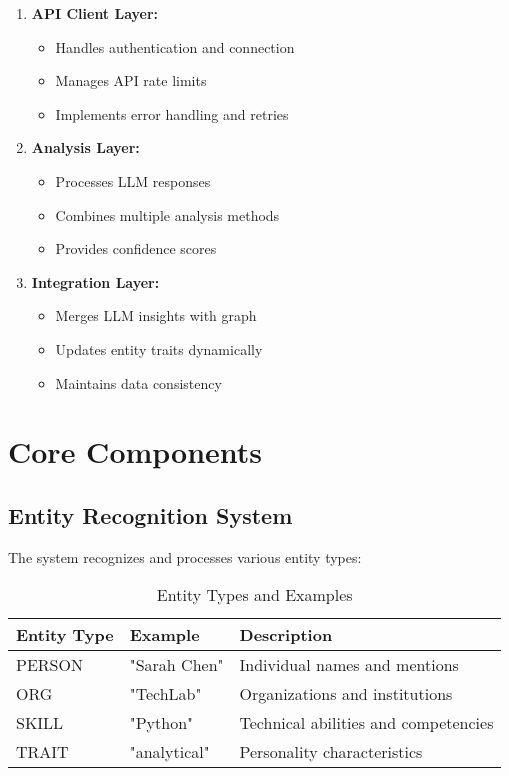 \documentclass[11pt]{article}
\begin{document}
\begin{enumerate}[label=\textbf{\arabic*.}, itemsep=0.5em]
    \item \textbf{API Client Layer:}
    \begin{itemize}
        \item Handles authentication and connection
        \item Manages API rate limits
        \item Implements error handling and retries
    \end{itemize}
    
    \item \textbf{Analysis Layer:}
    \begin{itemize}
        \item Processes LLM responses
        \item Combines multiple analysis methods
        \item Provides confidence scores
    \end{itemize}
    
    \item \textbf{Integration Layer:}
    \begin{itemize}
        \item Merges LLM insights with graph
        \item Updates entity traits dynamically
        \item Maintains data consistency
    \end{itemize}
\end{enumerate}

\section{Core Components}

\subsection{Entity Recognition System}
The system recognizes and processes various entity types:

\begin{table}[H]
\centering
\begin{tabular}{@{}llp{8cm}@{}}
\toprule
\textbf{Entity Type} & \textbf{Example} & \textbf{Description} \\
\midrule
PERSON & "Sarah Chen" & Individual names and mentions \\
ORG & "TechLab" & Organizations and institutions \\
SKILL & "Python" & Technical abilities and competencies \\
TRAIT & "analytical" & Personality characteristics \\
\bottomrule
\end{tabular}
\caption{Entity Types and Examples}
\label{tab:entities}
\end{table}
\end{document}
